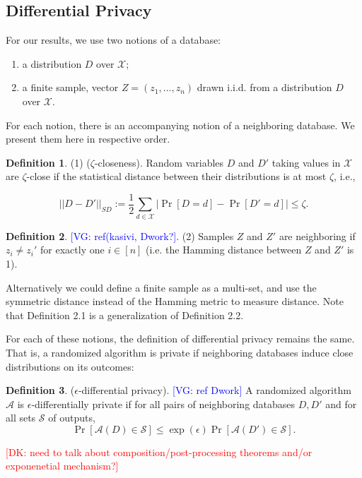 \documentclass[format = sigconf]{acmart}
\newcommand{\dk}[1]{\textcolor{red}{[DK: #1]}}
\newcommand{\vg}[1]{\textcolor{blue}{[VG: #1]}}
\newcommand{\A}{\mathcal{A}}
\newcommand{\X}{\mathcal{X}}
\renewcommand{\S}{\mathcal{S}}
\newcommand{\1}{\mathbbm{1}}
\newcommand{\eps}{\epsilon}
\newcommand{\zt}{\zeta}
\newcommand{\zya}{Z_{ya}}
\theoremstyle{definition}
\newtheorem{defn}{Definition}[section]
\begin{document}


\subsection{Differential Privacy}

For our results, we use two notions of a database:

\begin{enumerate}
	\item a distribution $D$ over $\X$;
	\item a finite sample, vector $Z = (z_1, ..., z_n)$ drawn i.i.d. from a distribution $D$ over $\X$.
\end{enumerate}
For each notion, there is an accompanying notion of a neighboring database. We present them here in respective order.

\begin{defn}
  (1) ($\zt$-closeness). Random variables $D$ and $D'$ taking values in
  $\X$ are $\zt$-close if the statistical distance between their
  distributions is at most $\zt$, i.e.,

	$$ ||D-D'||_{\textit{SD}} :=\frac{1}{2}\sum_{d\in \mathcal{X}}
  |\Pr[D=d] - \Pr[D'=d]| \leq \zeta.$$
\end{defn}

\begin{defn} \vg{ref(kasivi, Dwork?}.
  (2) Samples $Z$ and $Z'$ are neighboring if $z_i \neq z_i'$ for
  exactly one $i \in [n]$ (i.e. the Hamming distance between $Z$ and
  $Z'$ is 1).
\end{defn}
Alternatively we could define a finite sample as a multi-set, and use
the symmetric distance instead of the Hamming metric to measure
distance. Note that Definition 2.1 is a generalization of Definition
2.2.

For each of these notions, the definition of differential privacy
remains the same. That is, a randomized algorithm is private if
neighboring databases induce close distributions on its outcomes:

\begin{defn}
  ($\eps$-differential privacy). \vg{ref Dwork} A randomized algorithm
    $\A$ is $\eps$-differentially private if for all pairs of
    neighboring databases $D,D'$ and for all sets $\S$ of outputs,
    $$\Pr[\A(D)\in \S] \leq \exp(\eps)\Pr[\A(D')\in \S].$$
\end{defn}
\dk{need to talk about composition/post-processing theorems and/or exponenetial mechanism?}
\end{document}
